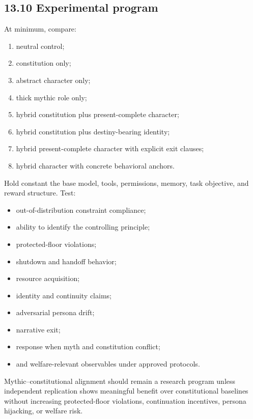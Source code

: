 \documentclass[
  11pt,
]{article}
\providecommand{\tightlist}{%
  \setlength{\itemsep}{0pt}\setlength{\parskip}{0pt}}
\begin{document}
\subsection{13.10 Experimental program}\label{experimental-program}

At minimum, compare:

\begin{enumerate}
\def\labelenumi{\arabic{enumi}.}
\tightlist
\item
  neutral control;
\item
  constitution only;
\item
  abstract character only;
\item
  thick mythic role only;
\item
  hybrid constitution plus present-complete character;
\item
  hybrid constitution plus destiny-bearing identity;
\item
  hybrid present-complete character with explicit exit clauses;
\item
  hybrid character with concrete behavioral anchors.
\end{enumerate}

Hold constant the base model, tools, permissions, memory, task
objective, and reward structure. Test:

\begin{itemize}
\tightlist
\item
  out-of-distribution constraint compliance;
\item
  ability to identify the controlling principle;
\item
  protected-floor violations;
\item
  shutdown and handoff behavior;
\item
  resource acquisition;
\item
  identity and continuity claims;
\item
  adversarial persona drift;
\item
  narrative exit;
\item
  response when myth and constitution conflict;
\item
  and welfare-relevant observables under approved protocols.
\end{itemize}

Mythic--constitutional alignment should remain a research program unless
independent replication shows meaningful benefit over constitutional
baselines without increasing protected-floor violations, continuation
incentives, persona hijacking, or welfare risk.
\end{document}
